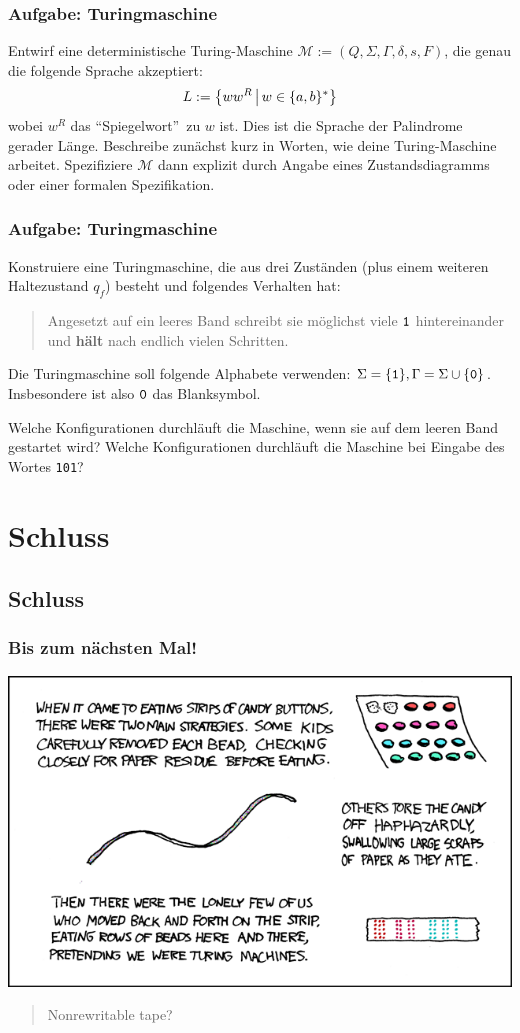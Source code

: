 \begin{frame}
\frametitle{Aufgabe: Turingmaschine}
Entwirf eine deterministische Turing-Maschine $\mathcal M := (Q, \Sigma, \Gamma, \delta, s, F)$, die genau die folgende Sprache akzeptiert: $$L:=\left\lbrace ww^R \,\middle\vert\,  w \in \{a, b\}^* \right\rbrace$$ wobei $w^R$ das "`Spiegelwort"'~zu $w$ ist.
Dies ist die Sprache der Palindrome gerader Länge.  Beschreibe zunächst kurz in Worten, wie deine Turing-Maschine arbeitet. 
Spezifiziere $\mathcal M$ dann explizit durch Angabe eines Zustandsdiagramms oder einer formalen Spezifikation.
\end{frame}
\begin{frame}
\frametitle{Aufgabe: Turingmaschine}
 \label{sec:busy_beaver}

Konstruiere eine Turingmaschine, die aus drei Zuständen (plus einem
weiteren Haltezustand $q_f$) besteht und folgendes Verhalten hat:
\begin{quote}
  Angesetzt auf ein leeres Band schreibt sie möglichst viele ${\tt 1}$
  hintereinander und \textbf{hält} nach endlich vielen Schritten.
\end{quote}
Die Turingmaschine soll folgende Alphabete verwenden: $\Sigma = \{{\tt 1}\},
\Gamma = \Sigma \cup \{{\tt 0}\}$.  Insbesondere ist also ${\tt 0}$ das
Blanksymbol.

Welche Konfigurationen durchläuft die Maschine, wenn sie auf dem leeren Band
gestartet wird?  Welche Konfigurationen durchläuft die Maschine bei Eingabe
des Wortes {\tt 101}?
\end{frame}

\section{Schluss}
\subsection{Schluss}

\begin{frame}
\frametitle{Bis zum nächsten Mal!}
\begin{center}
  \includegraphics[height=0.8 \textheight]{images/xkcd_205.png} 
\end{center}

\begin{quote}\tiny{Nonrewritable tape?}
\end{quote}
\end{frame}


